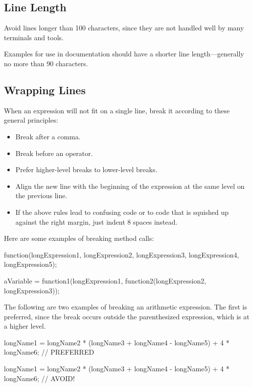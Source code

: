 \documentclass{article}
\newenvironment{note}[1]
  {\begin{notes}\item #1}{\end{notes}}
\begin{document}
\subsection{Line Length}

Avoid lines longer than 100 characters, since they are not handled well by many terminals and
tools.

\begin{note}
Examples for use in documentation should have a shorter line length---generally no more than 90
characters.
\end{note}

\subsection{Wrapping Lines}

When an expression will not fit on a single line, break it according to these general principles:

\begin{itemize}
\item Break after a comma.
\item Break before an operator.
\item Prefer higher-level breaks to lower-level breaks.
\item Align the new line with the beginning of the expression at the same level on the previous
  line.
\item If the above rules lead to confusing code or to code that is squished up against the right
  margin, just indent 8 spaces instead.
\end{itemize}

Here are some examples of breaking method calls:

\begin{snippet}
function(longExpression1, longExpression2, longExpression3,
        longExpression4, longExpression5);

aVariable = function1(longExpression1,
        function2(longExpression2,
                longExpression3));
\end{snippet}


The following are two examples of breaking an arithmetic expression. The first is preferred, since
the break occurs outside the parenthesized expression, which is at a higher level.

\begin{snippet}
longName1 = longName2 * (longName3 + longName4 - longName5)
            + 4 * longName6; // PREFERRED

longName1 = longName2 * (longName3 + longName4
                         - longName5) + 4 * longName6; // AVOID!
\end{snippet}
\end{document}
